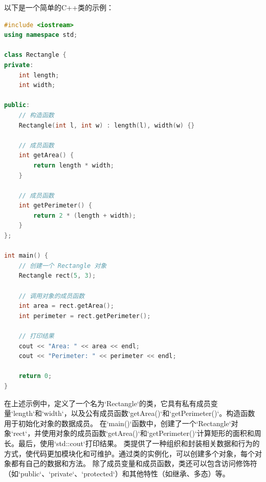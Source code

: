 \documentclass[12pt,twiside,a4paper]{ctexbook}
\numberwithin{chapter}{part}
\begin{document}
以下是一个简单的C++类的示例：

\begin{lstlisting}[language=C++]
#include <iostream>
using namespace std;

class Rectangle {
private:
    int length;
    int width;

public:
    // 构造函数
    Rectangle(int l, int w) : length(l), width(w) {}

    // 成员函数
    int getArea() {
        return length * width;
    }

    // 成员函数
    int getPerimeter() {
        return 2 * (length + width);
    }
};

int main() {
    // 创建一个 Rectangle 对象
    Rectangle rect(5, 3);

    // 调用对象的成员函数
    int area = rect.getArea();
    int perimeter = rect.getPerimeter();

    // 打印结果
    cout << "Area: " << area << endl;
    cout << "Perimeter: " << perimeter << endl;

    return 0;
}
\end{lstlisting}
在上述示例中，定义了一个名为`Rectangle`的类，它具有私有成员变量`length`和`width`，以及公有成员函数`getArea()`和`getPerimeter()`。构造函数用于初始化对象的数据成员。
在`main()`函数中，创建了一个`Rectangle`对象`rect`，并使用对象的成员函数`getArea()`和`getPerimeter()`计算矩形的面积和周长。最后，使用`std::cout`打印结果。
类提供了一种组织和封装相关数据和行为的方式，使代码更加模块化和可维护。通过类的实例化，可以创建多个对象，每个对象都有自己的数据和方法。
除了成员变量和成员函数，类还可以包含访问修饰符（如`public`、`private`、`protected`）和其他特性（如继承、多态）等。
\end{document}
